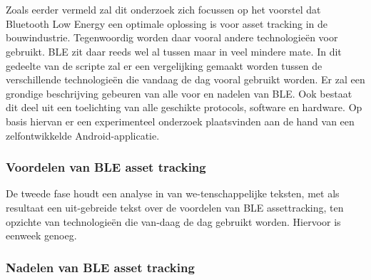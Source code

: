 
\chapter{}%
\label{ch:methodologie}


Zoals eerder vermeld zal dit onderzoek zich focussen op het voorstel dat Bluetooth Low Energy een optimale oplossing is voor asset tracking in de bouwindustrie. Tegenwoordig worden daar vooral andere technologieën voor gebruikt. BLE zit daar reeds wel al tussen maar in veel mindere mate. In dit gedeelte van de scripte zal er een vergelijking gemaakt worden tussen de verschillende technologieën die vandaag de dag vooral gebruikt worden. Er zal een grondige beschrijving gebeuren van alle voor en nadelen van BLE. Ook bestaat dit deel uit een toelichting van alle geschikte protocols, software en hardware. Op basis hiervan er een experimenteel onderzoek plaatsvinden aan de hand van een zelfontwikkelde Android-applicatie.

\subsection{Voordelen van BLE asset tracking}

De tweede fase houdt een analyse in van we-tenschappelijke teksten, met als resultaat een uit-gebreide tekst over de voordelen van BLE assettracking, ten opzichte van technologieën die van-daag de dag gebruikt worden. Hiervoor is eenweek genoeg.
\subsection{Nadelen van BLE asset tracking}


